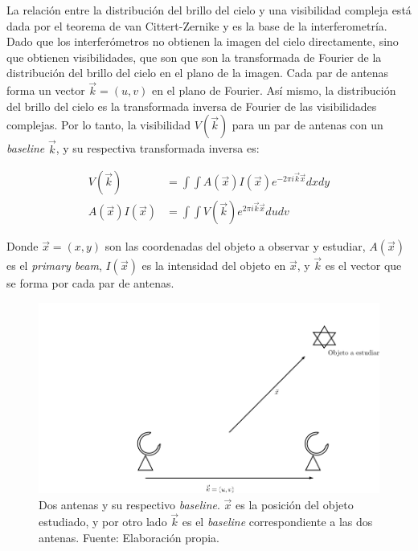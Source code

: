 La relación entre la distribución del brillo del cielo y una visibilidad compleja está dada por el teorema de van Cittert-Zernike \citep{zernike} y es la base de la interferometría. Dado que los interferómetros no obtienen la imagen del cielo directamente, sino que obtienen visibilidades, que son que son la transformada de Fourier de la distribución del brillo del cielo en el plano de la imagen. Cada par de antenas forma un vector $\vec{k} = (u,v)$ en el plano de Fourier. Así mismo, la distribución del brillo del cielo es la transformada inversa de Fourier de las visibilidades complejas. Por lo tanto, la visibilidad $V(\vec{k})$ para un par de antenas con un \textit{baseline} $\vec{k}$, y su respectiva transformada inversa es:


\begin{align}
V(\vec{k}) &= \int\int A(\vec{x})I(\vec{x})e^{-2\pi i\vec{k}\vec{x}}dxdy \\
A(\vec{x})I(\vec{x}) &= \int\int V(\vec{k})e^{2\pi i\vec{k}\vec{x}}dudv
\end{align}

Donde $\vec{x} = (x,y)$ son las coordenadas del objeto a observar y estudiar, $A(\vec{x})$ es el \textit{primary beam}, $I(\vec{x})$ es la intensidad del objeto en $\vec{x}$, y $\vec{k}$ es el vector que se forma por cada par de antenas. 

\begin{figure}[h!]
\centering
\includegraphics[scale=0.4]{images/antenas.png}
\caption{Dos antenas y su respectivo \textit{baseline}. $\vec{x}$ es la posición del objeto estudiado, y por otro lado $\vec{k}$ es el \textit{baseline} correspondiente a las dos antenas. Fuente: Elaboración propia.}
\label{fig:antena}
\end{figure}

